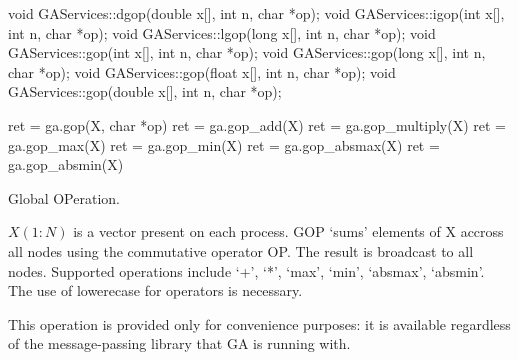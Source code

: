 \documentclass[12pt]{article}
\begin{document}
\begin{cxxapi}
\begin{cxxcode}
void GAServices::dgop(double x[], int n, char *op);
void GAServices::igop(int x[], int n, char *op);
void GAServices::lgop(long x[], int n, char *op);
void GAServices::gop(int x[], int n, char *op);
void GAServices::gop(long x[], int n, char *op);
void GAServices::gop(float x[], int n, char *op);
void GAServices::gop(double x[], int n, char *op);
\end{cxxcode}
\begin{funcargs}
\end{funcargs}
\end{cxxapi}

\begin{pyapi}
\begin{pycode}
ret = ga.gop(X, char *op)
ret = ga.gop_add(X)
ret = ga.gop_multiply(X)
ret = ga.gop_max(X)
ret = ga.gop_min(X)
ret = ga.gop_absmax(X)
ret = ga.gop_absmin(X)
\end{pycode}
\begin{funcargs}
\end{funcargs}
\end{pyapi}

\wcoll

\begin{desc}

Global OPeration.

$X(1:N)$ is a vector present on each process. GOP `sums' elements of X accross
all nodes using the commutative operator OP. The result is broadcast to all
nodes. Supported operations include `+', `*', `max', `min', `absmax', `absmin'.
The use of lowerecase for operators is necessary.

This operation is provided only for convenience purposes: it is available
regardless of the message-passing library that GA is running with.

\end{desc}

\end{document}
